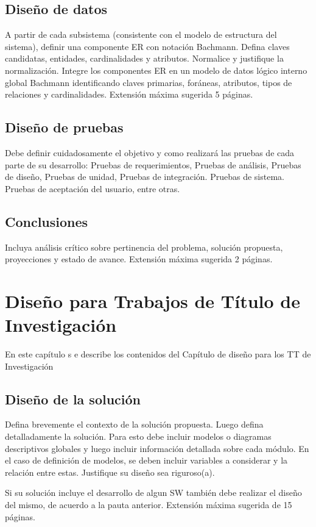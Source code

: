 \subsection{Diseño de datos}  \label{disenodat}
A partir de cada subsistema (consistente con el modelo de estructura del sistema),
definir una componente ER con notación Bachmann. Defina claves candidatas, entidades,
cardinalidades y atributos. Normalice y justifique la normalización. Integre los
componentes ER en un modelo de datos lógico interno global Bachmann identificando
claves primarias, foráneas, atributos, tipos de relaciones y cardinalidades. Extensión máxima sugerida 5 páginas.


 \subsection{Diseño de pruebas}

  Debe definir cuidadosamente el objetivo y como realizará las pruebas de cada parte de su desarrollo:  Pruebas de requerimientos, Pruebas de análisis,  Pruebas de diseño, Pruebas de unidad, Pruebas de integración. Pruebas de sistema. Pruebas de aceptación del usuario, entre otras.


\subsection{Conclusiones}  \label{conclusiones}
Incluya análisis crítico sobre  pertinencia del problema, solución propuesta, proyecciones
y estado de avance. Extensión máxima sugerida 2 páginas.


\section{Diseño para Trabajos de Título de Investigación}
\label{diseno}
En este capítulo s e describe los contenidos del Capítulo de diseño para los TT de Investigación
\subsection{Diseño de la solución} \label{disenosol}
Defina brevemente el contexto de la solución propuesta. Luego defina detalladamente
la solución. Para esto debe incluir modelos o diagramas descriptivos globales
y luego incluir información detallada sobre cada módulo. En el caso de definición de
modelos, se deben incluir variables a considerar y la relación entre estas. Justifique
su diseño sea riguroso(a).

 Si su solución incluye el desarrollo de algun SW también debe realizar el diseño del mismo, de acuerdo a la pauta anterior.
   Extensión máxima sugerida de 15 páginas.


